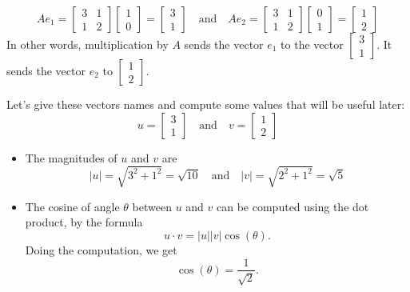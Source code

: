 \documentclass[10pt]{article}
\theoremstyle{definition}
\begin{document}
\begin{equation*}
  Ae_{1}
  =
  \begin{bmatrix}
    3&1\\
    1&2
  \end{bmatrix}
  \begin{bmatrix}
    1\\0
  \end{bmatrix}
  =
  \begin{bmatrix}
    3\\1
  \end{bmatrix}
  \quad \text{and} \quad
  Ae_{2}
  =
  \begin{bmatrix}
    3&1\\
    1&2
  \end{bmatrix}
  \begin{bmatrix}
    0\\1
  \end{bmatrix}
  =
  \begin{bmatrix}
    1\\2
  \end{bmatrix}
\end{equation*}
In other words, multiplication by $A$ sends the vector $e_{1}$ to the vector
$\begin{bmatrix} 3\\1 \end{bmatrix}$. It sends the vector $e_{2}$ to
$\begin{bmatrix} 1\\2 \end{bmatrix}$.

Let's give these vectors names and compute some values that will be useful later:
\begin{equation*}
  u =
  \begin{bmatrix}
    3\\1
  \end{bmatrix}
  \quad \text{and} \quad
  v =
  \begin{bmatrix}
    1\\2
  \end{bmatrix}
\end{equation*}
\begin{itemize}
  \item The magnitudes of $u$ and $v$ are
  \begin{equation*}
    |u| = \sqrt{3^{2}+1^{2}} = \sqrt{10}
    \quad \text{and} \quad
    |v| = \sqrt{2^{2}+1^{2}} = \sqrt{5}
  \end{equation*}
  \item The cosine of angle $\theta$ between $u$ and $v$ can be computed using
  the dot product, by the formula
  \begin{equation*}
    u\cdot v = |u||v| \cos(\theta).
  \end{equation*}
  Doing the computation, we get
  \begin{equation}\label{eq:cosine-example}
    \cos(\theta) = \frac{1}{\sqrt{2}}.
  \end{equation}
\end{itemize}
\end{document}
